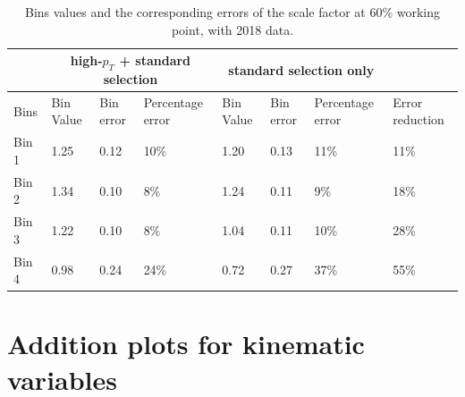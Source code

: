 \documentclass[letterpaper,12pt]{article}
\begin{document}
 \begin{table}[h]
 \begin{centering}
 \begin{tabular}{|p{2.5em}||p{2.5em}|p{2.5em}|p{5em}||p{2.5em}|p{2.5em}|p{5em}||p{5em}|}
          \hline
          & \multicolumn{3}{|c||}{high-$p_{T}$ + standard selection} & \multicolumn{3}{|c||}{standard selection only} & \\  \hline\hline
          Bins& Bin Value &Bin error&Percentage error&Bin Value &Bin error&Percentage error & Error reduction\\ \hline
          Bin 1 & 1.25 & 0.12 & 10\% &1.20 & 0.13 & 11\% & 11\% \\ \hline
          Bin 2 & 1.34 & 0.10 & 8\% & 1.24 & 0.11 & 9\% & 18\% \\ \hline
          Bin 3 & 1.22 & 0.10 & 8\% & 1.04 & 0.11 & 10\% & 28\% \\ \hline
          Bin 4 & 0.98 & 0.24 & 24\% & 0.72 & 0.27 & 37\% & 55\% \\ \hline
          
 
 \end{tabular} 
 \caption{Bins values and the corresponding errors of the scale factor at 60\% working point, with 2018 data.}
 \end{centering}
 \label{tab:limit}
 \end{table}

\fi

\newpage
\printbibliography
\appendix
\newpage
\section{Addition plots for kinematic variables}
\end{document}
